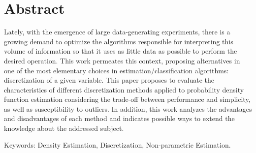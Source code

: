 %
%
\chapter*{Abstract}


\noindent 

Lately, with the emergence of large data-generating experiments, there is a growing demand to optimize the algorithms responsible for interpreting this volume of information so that it uses as little data as possible to perform the desired operation. This work permeates this context, proposing alternatives in one of the most elementary choices in estimation/classification algorithms: discretization of a given variable. This paper proposes to evaluate the characteristics of different discretization methods applied to probability density function estimation considering the trade-off between performance and simplicity, as well as susceptibility to outliers. In addition, this work analyzes the advantages and disadvantages of each method and indicates possible ways to extend the knowledge about the addressed subject.
\vspace{0.5cm}

\noindent Keywords: Density Estimation, Discretization, Non-parametric Estimation. \\

\newpage
